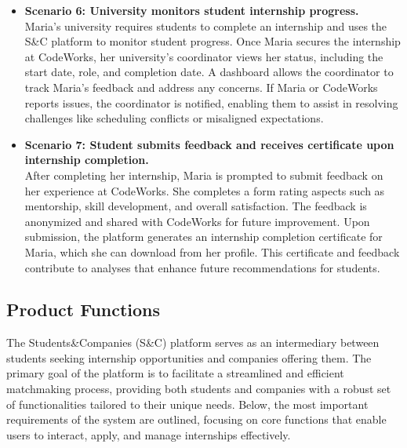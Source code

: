 \begin{itemize}
    \item \textbf{Scenario 6: University monitors student internship progress.} \\
    Maria’s university requires students to complete an internship and uses the S\&C platform to monitor student progress. Once Maria secures the internship at CodeWorks, her university’s coordinator views her status, including the start date, role, and completion date. A dashboard allows the coordinator to track Maria’s feedback and address any concerns. If Maria or CodeWorks reports issues, the coordinator is notified, enabling them to assist in resolving challenges like scheduling conflicts or misaligned expectations.

    \item \textbf{Scenario 7: Student submits feedback and receives certificate upon internship completion.}  \\
    After completing her internship, Maria is prompted to submit feedback on her experience at CodeWorks. She completes a form rating aspects such as mentorship, skill development, and overall satisfaction. The feedback is anonymized and shared with CodeWorks for future improvement. Upon submission, the platform generates an internship completion certificate for Maria, which she can download from her profile. This certificate and feedback contribute to analyses that enhance future recommendations for students.
\end{itemize}

\newpage

\subsection{Product Functions}

The Students\&Companies (S\&C) platform serves as an intermediary between students seeking internship opportunities and companies offering them. The primary goal of the platform is to facilitate a streamlined and efficient matchmaking process, providing both students and companies with a robust set of functionalities tailored to their unique needs. Below, the most important requirements of the system are outlined, focusing on core functions that enable users to interact, apply, and manage internships effectively.
